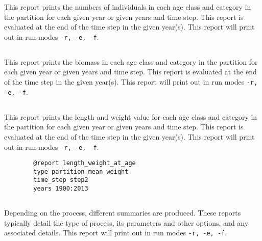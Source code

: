 This report prints the numbers of individuals in each age class and category in the partition for each given year or given years and time step. This report is evaluated at the end of the time step in the given year(s). This report will print out in run modes \texttt{-r, -e, -f}.

\subsection{}\label{sec:Report-PartitionBiomass}

This report prints the biomass in each age class and category in the partition for each given year or given years and time step. This report is evaluated at the end of the time step in the given year(s). This report will print out in run modes \texttt{-r, -e, -f}.

\subsection{}\label{sec:Report-AgeLength}\label{sec:Report-LenthWeight}

This report prints the length and weight value for each age class and category in the partition for each given year or given years and time step. This report is evaluated at the end of the time step in the given year(s). This report will print out in run modes \texttt{-r, -e, -f}.

\begin{verbatim}
		@report length_weight_at_age
		type partition_mean_weight
		time_step step2
		years 1900:2013
\end{verbatim}

\subsection{}\label{sec:Report-Process}

Depending on the process, different summaries are produced. These reports typically detail the type of process, its parameters and other options, and any associated details. This report will print out in run modes \texttt{-r, -e, -f}.

\subsection{}\label{sec:Report-DerivedQuantity}

